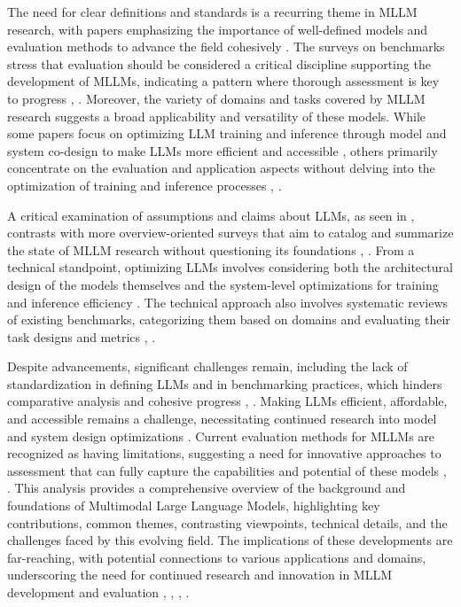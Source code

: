 \documentclass[conference]{IEEEtran}
\begin{document}
The need for clear definitions and standards is a recurring theme in MLLM research, with papers emphasizing the importance of well-defined models and evaluation methods to advance the field cohesively \cite{b1}. The surveys on benchmarks stress that evaluation should be considered a critical discipline supporting the development of MLLMs, indicating a pattern where thorough assessment is key to progress \cite{b2}, \cite{b3}. Moreover, the variety of domains and tasks covered by MLLM research suggests a broad applicability and versatility of these models. While some papers focus on optimizing LLM training and inference through model and system co-design to make LLMs more efficient and accessible \cite{b4}, others primarily concentrate on the evaluation and application aspects without delving into the optimization of training and inference processes \cite{b2}, \cite{b3}.

A critical examination of assumptions and claims about LLMs, as seen in \cite{b1}, contrasts with more overview-oriented surveys that aim to catalog and summarize the state of MLLM research without questioning its foundations \cite{b2}, \cite{b3}. From a technical standpoint, optimizing LLMs involves considering both the architectural design of the models themselves and the system-level optimizations for training and inference efficiency \cite{b4}. The technical approach also involves systematic reviews of existing benchmarks, categorizing them based on domains and evaluating their task designs and metrics \cite{b2}, \cite{b3}.

Despite advancements, significant challenges remain, including the lack of standardization in defining LLMs and in benchmarking practices, which hinders comparative analysis and cohesive progress \cite{b1}, \cite{b2}. Making LLMs efficient, affordable, and accessible remains a challenge, necessitating continued research into model and system design optimizations \cite{b4}. Current evaluation methods for MLLMs are recognized as having limitations, suggesting a need for innovative approaches to assessment that can fully capture the capabilities and potential of these models \cite{b2}, \cite{b3}. This analysis provides a comprehensive overview of the background and foundations of Multimodal Large Language Models, highlighting key contributions, common themes, contrasting viewpoints, technical details, and the challenges faced by this evolving field. The implications of these developments are far-reaching, with potential connections to various applications and domains, underscoring the need for continued research and innovation in MLLM development and evaluation \cite{b1}, \cite{b2}, \cite{b3}, \cite{b4}.
\end{document}
